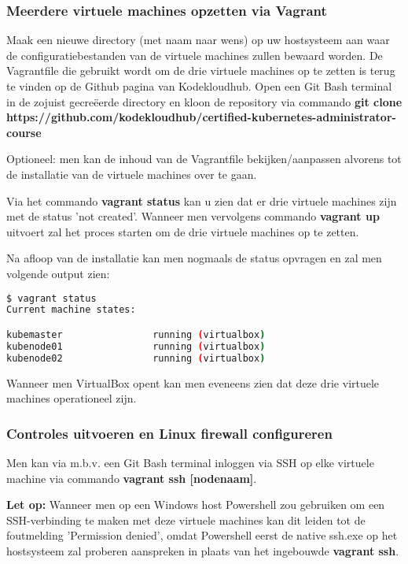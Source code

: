 \subsubsection{Meerdere virtuele machines opzetten via Vagrant}

Maak een nieuwe directory (met naam naar wens) op uw hostsysteem aan waar de configuratiebestanden van de virtuele machines zullen bewaard worden. 
De Vagrantfile die gebruikt wordt om de drie virtuele machines op te zetten is terug te vinden op de Github pagina van Kodekloudhub. Open een Git Bash terminal in de zojuist gecreëerde directory en kloon de repository via commando {\bf git clone https://github.com/kodekloudhub/certified-kubernetes-administrator-course}

Optioneel: men kan de inhoud van de Vagrantfile bekijken/aanpassen alvorens tot de installatie van de virtuele machines over te gaan. 

Via het commando {\bf vagrant status} kan u zien dat er drie virtuele machines zijn met de status 'not created'. Wanneer men vervolgens commando {\bf vagrant up} uitvoert zal het proces starten om de drie virtuele machines op te zetten.

Na afloop van de installatie kan men nogmaals de status opvragen en zal men volgende output zien:
\begin{lstlisting}[language=bash]
$ vagrant status
Current machine states:

kubemaster                running (virtualbox)
kubenode01                running (virtualbox)
kubenode02                running (virtualbox)
\end{lstlisting}

Wanneer men VirtualBox opent kan men eveneens zien dat deze drie virtuele machines operationeel zijn. 


\subsubsection{Controles uitvoeren en Linux firewall configureren}

Men kan via m.b.v. een Git Bash terminal inloggen via SSH op elke virtuele machine via commando {\bf vagrant ssh [nodenaam]}.

{\bf Let op:} Wanneer men op een Windows host Powershell zou gebruiken om een SSH-verbinding te maken met deze virtuele machines kan dit leiden tot de foutmelding 'Permission denied', omdat Powershell eerst de native ssh.exe op het hostsysteem zal proberen aanspreken in plaats van het ingebouwde {\bf vagrant ssh}.

